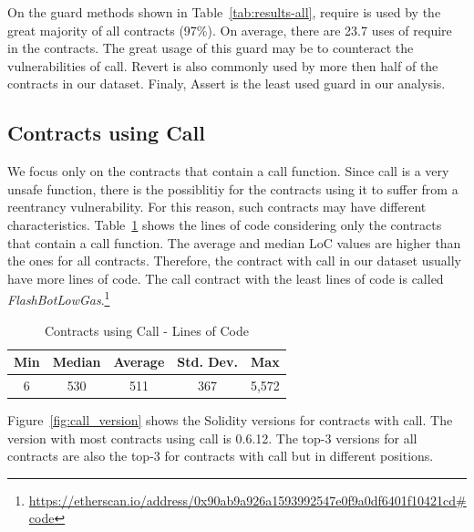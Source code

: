 \documentclass[10pt,conference]{IEEEtran}
\begin{document}
On the guard methods shown in Table~\ref{tab:results-all}, require is used by the great majority of all contracts (97\%).  On average, there are 23.7 uses of require in the contracts. The great usage of this guard may be to counteract the vulnerabilities of call.  Revert is also commonly used by more then half of the contracts in our dataset.  Finaly,  Assert is the least used guard in our analysis.

\subsection{Contracts using Call}

We focus only on the contracts that contain a call function. Since call is a very unsafe function, there is the possiblitiy for the contracts using it to suffer from a reentrancy vulnerability.  For this reason, such contracts may have different characteristics.  Table~\ref{tab:call-loc} shows the lines of code considering only the contracts that contain a call function. The average and median LoC values are higher than the ones for all contracts. Therefore, the contract with call in our dataset usually have more lines of code.  The call contract with the least lines of code is called \textit{FlashBotLowGas}.\footnote{\url{https://etherscan.io/address/0x90ab9a926a1593992547e0f9a0df6401f10421cd\#code}}

\begin{table}[b]
\center
  \caption{Contracts using Call - Lines of Code}
  \label{tab:call-loc}
  \begin{tabular}{c c c c c}
    \hline
    Min & Median & Average & Std. Dev. & Max \\
    \hline
   6 & 530 & 511 & 367 & 5,572 \\
  \hline
\end{tabular}
\end{table}

Figure~\ref{fig:call_version} shows the Solidity versions for contracts with call. The version with most contracts using call is 0.6.12.  The top-3 versions for all contracts are also the top-3 for contracts with call but in different positions. 
\end{document}
